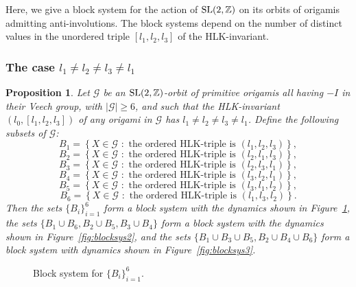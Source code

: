 \documentclass[a4paper,11pt]{amsart}
\numberwithin{equation}{section}
\numberwithin{figure}{section}
\numberwithin{table}{section}
\newtheorem{proposition}[theorem]{Proposition}
\newcommand{\Z}{\mathbb{Z}}
\newcommand{\orb}{\mathcal{G}}
\DeclareMathOperator{\SL}{{\rm{SL}}}
\begin{document}
Here, we give a block system for the action of $\SL(2,\Z)$ on its orbits of origamis admitting anti-involutions.  The block systems depend on the number of distinct values in the unordered triple $[l_{1},l_{2},l_{3}]$ of the HLK-invariant.

\subsubsection{The case ${l_{1}\neq l_{2}\neq l_{3}\neq l_{1}}$}

\begin{proposition}\label{prop:all_diff}
    Let $\orb$ be an $\SL(2,\Z)$-orbit of primitive origamis all having $-I$ in their Veech group, with $|\orb|\geq 6$, and such that the HLK-invariant $(l_{0},[l_{1},l_{2},l_{3}])$ of any origami in $\orb$ has $l_{1}\neq l_{2}\neq l_{3}\neq l_{1}$. Define the following subsets of $\orb$:
    \[B_{1} = \left\{X \in \orb\,\,: \,\,\text{the ordered HLK-triple is }(l_{1},l_{2},l_{3})\right\},\]
    \[B_{2} = \left\{X \in \orb\,\,: \,\,\text{the ordered HLK-triple is }(l_{2},l_{1},l_{3})\right\},\]
    \[B_{3} = \left\{X \in \orb\,\,: \,\,\text{the ordered HLK-triple is }(l_{2},l_{3},l_{1})\right\},\]
    \[B_{4} = \left\{X \in \orb\,\,: \,\,\text{the ordered HLK-triple is }(l_{3},l_{2},l_{1})\right\},\]
    \[B_{5} = \left\{X \in \orb\,\,: \,\,\text{the ordered HLK-triple is }(l_{3},l_{1},l_{2})\right\},\]
    \[B_{6} = \left\{X \in \orb\,\,: \,\,\text{the ordered HLK-triple is }(l_{1},l_{3},l_{2})\right\}.\]
    Then the sets $\{B_{i}\}_{i = 1}^{6}$ form a block system with the dynamics shown in Figure~\ref{fig:blocksys1}, the sets $\{B_{1}\cup B_{6}, B_{2}\cup B_{5}, B_{3}\cup B_{4}\}$ form a block system with the dynamics shown in Figure~\ref{fig:blocksys2}, and the sets $\{B_{1}\cup B_{3}\cup B_{5},B_{2}\cup B_{4}\cup B_{6}\}$ form a block system with dynamics shown in Figure~\ref{fig:blocksys3}.
\end{proposition}

\begin{figure}[t]
\begin{center}
\end{center}
\caption{Block system for $\{B_{i}\}_{i = 1}^{6}$.}
\label{fig:blocksys1}
\end{figure}
\end{document}
